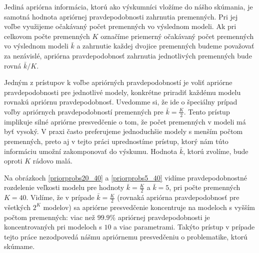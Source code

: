 Jediná apriórna informácia, ktorú ako výskumníci vložíme do nášho skúmania,
je samotná hodnota apriórnej pravdepodobnosti zahrnutia premenných.
Pri jej voľbe využijeme očakávaný počet premenných vo výslednom modeli.
Ak pri celkovom počte premenných \(K\) označíme priemerný očakávaný počet premenných vo výslednom modeli \(\bar{k}\) a zahrnutie každej dvojice premenných budeme považovať za nezávislé,
apriórna pravdepodobnosť zahrnutia jednotlivých premenných bude rovná \(\bar{k}/K\).

Jedným z prístupov k voľbe apriórných pravdepodobností je voliť apriórne pravdepodobnosti pre jednotlivé modely,
konkrétne priradiť každému modelu rovnakú apriórnu pravdepodobnosť.
Uvedomme si, že ide o špeciálny prípad voľby apriórnych pravdepodobností premenných pre \(\bar{k} = \frac{K}{2}\).
Tento prístup implikuje silné apriórne presvedčenie o tom, že počet premenných v modeli má byť vysoký.
V praxi často preferujeme jednoduchšie modely s menším počtom premenných, preto aj v tejto práci uprednostíme prístup,
ktorý nám túto informáciu umožní zakomponovať do výskumu.
Hodnota \(\bar{k}\), ktorú zvolíme, bude oproti \(K\) rádovo malá.

Na obrázkoch \ref{priorprobs20_40} a \ref{priorprobs5_40} vidíme pravdepodobnostné rozdelenie veľkosti modelu pre hodnoty \(\bar{k} = \frac{K}{2}\) a \(\bar{k} = 5\),
pri počte premenných \(K = 40\).
Vidíme, že v prípade \(\bar{k} = \frac{K}{2}\) (rovnaká apriórna pravdepodobnosť pre všetkých \(2^K\) modelov)
sa apriórne presvedčenie koncentruje na modeloch s vyšším počtom premenných: viac než \(99.9 \%\)
apriórnej pravdepodobnosti je koncentrovaných pri modeloch s \(10\) a viac parametrami.
Takýto prístup v prípade tejto práce nezodpovedá nášmu apriórnemu presvedčeniu o problematike, ktorú skúmame.

